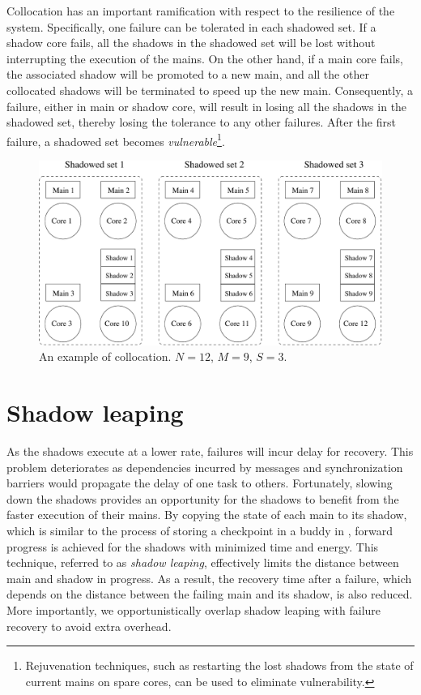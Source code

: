 Collocation has an important ramification with respect to the resilience of the system. Specifically, 
one failure can be tolerated in each shadowed set. If a shadow core fails, all the shadows in the 
shadowed set will be lost without interrupting the execution of the mains. 
On the other hand, if a main core fails, the associated shadow will be promoted to a new main, and all 
the other collocated shadows will be terminated to speed up the new main.
Consequently, a failure, either in main or shadow core, will result in losing all the shadows in the shadowed set, thereby losing the tolerance to any other failures. After the first failure, a shadowed set becomes \emph{vulnerable}\footnote{Rejuvenation techniques, such as restarting the lost shadows from the state of current mains on spare cores, can be used to eliminate vulnerability.}. 
 
\begin{figure}[!b]
  \begin{center}
    \includegraphics[width=0.8\columnwidth]{figures/sc_mapping.pdf}
  \end{center}
  \caption{An example of collocation. $N=12$, $M=9$, $S=3$.}
  \label{fig:sc_mapping}
\end{figure}


\section{Shadow leaping}
\label{sec:leaping_shadows}

As the shadows execute at a lower rate, failures will incur delay for recovery. This problem deteriorates as dependencies incurred by messages and synchronization barriers would propagate the delay of one task to others.  
Fortunately, slowing down the shadows provides an opportunity for the shadows to benefit from the faster execution of their mains. By copying the state of each main to its shadow, which is similar to the process of storing a checkpoint in a buddy in \cite{zheng_2004_ftccharm}, forward progress is achieved for the shadows with minimized time and energy. This technique, referred to as \textit{shadow leaping}, effectively limits the distance between main and shadow in progress. 
As a result, the recovery time after a failure, which depends on the distance between the failing main 
and its shadow, is also reduced. 
More importantly, 
we opportunistically overlap shadow leaping with failure recovery to avoid extra overhead. 

